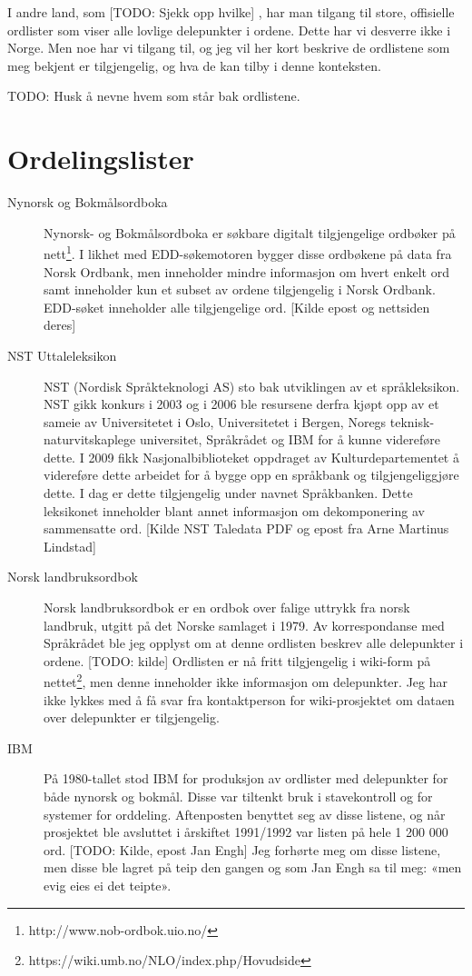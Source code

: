 I andre land, som [TODO: Sjekk opp hvilke] , har man tilgang til store, offisielle ordlister som viser alle lovlige delepunkter i ordene. Dette har vi desverre ikke i Norge. Men noe har vi tilgang til, og jeg vil her kort beskrive de ordlistene som meg bekjent er tilgjengelig, og hva de kan tilby i denne konteksten.

TODO: Husk å nevne hvem som står bak ordlistene.

\section{Ordelingslister}

\begin{description}
\item[Nynorsk og Bokmålsordboka]	Nynorsk- og Bokmålsordboka er søkbare digitalt tilgjengelige ordbøker på nett\footnote{http://www.nob-ordbok.uio.no/}. I likhet med EDD-søkemotoren bygger disse ordbøkene på data fra Norsk Ordbank, men inneholder mindre informasjon om hvert enkelt ord samt inneholder kun et subset av ordene tilgjengelig i Norsk Ordbank. EDD-søket inneholder alle tilgjengelige ord. [Kilde epost og nettsiden deres]
\item[NST Uttaleleksikon]	NST (Nordisk Språkteknologi AS) sto bak utviklingen av et språkleksikon. NST gikk konkurs i 2003 og i 2006 ble resursene derfra kjøpt opp av et sameie av Universitetet i Oslo, Universitetet i Bergen, Noregs teknisk-naturvitskaplege universitet, Språkrådet og IBM for å kunne videreføre dette. I 2009 fikk Nasjonalbiblioteket oppdraget av Kulturdepartementet å videreføre dette arbeidet for å bygge opp en språkbank og tilgjengeliggjøre dette. I dag er dette tilgjengelig under navnet Språkbanken. Dette leksikonet inneholder blant annet informasjon om dekomponering av sammensatte ord. [Kilde NST Taledata PDF og epost fra Arne Martinus Lindstad]
\item[Norsk landbruksordbok]	Norsk landbruksordbok er en ordbok over falige uttrykk fra norsk landbruk, utgitt på det Norske samlaget i 1979. Av korrespondanse med Språkrådet ble jeg opplyst om at denne ordlisten beskrev alle delepunkter i ordene. [TODO: kilde] Ordlisten er nå fritt tilgjengelig i wiki-form på nettet\footnote{https://wiki.umb.no/NLO/index.php/Hovudside}, men denne inneholder ikke informasjon om delepunkter. Jeg har ikke lykkes med å få svar fra kontaktperson for wiki-prosjektet om dataen over delepunkter er tilgjengelig. 
\item[IBM] 	På 1980-tallet stod IBM for produksjon av ordlister med delepunkter for både nynorsk og bokmål. Disse var tiltenkt bruk i stavekontroll og for systemer for orddeling. Aftenposten benyttet seg av disse listene, og når prosjektet ble avsluttet i årskiftet 1991/1992 var listen på hele 1 200 000 ord. [TODO: Kilde, epost Jan Engh] Jeg forhørte meg om disse listene, men disse ble lagret på teip den gangen og som Jan Engh sa til meg: «men evig eies ei det teipte».

\end{description}
